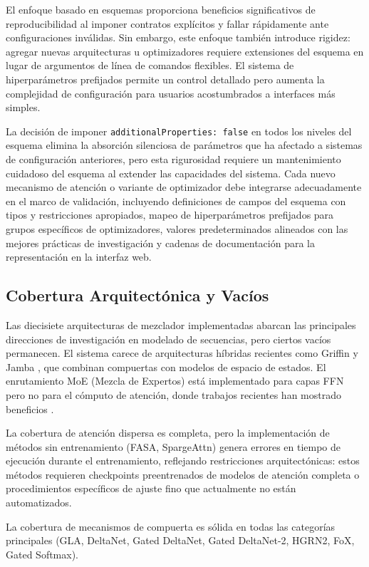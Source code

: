 \documentclass[11pt,a4paper]{article}
\begin{document}
El enfoque basado en esquemas proporciona beneficios significativos de reproducibilidad al imponer contratos explícitos y fallar rápidamente ante configuraciones inválidas. Sin embargo, este enfoque también introduce rigidez: agregar nuevas arquitecturas u optimizadores requiere extensiones del esquema en lugar de argumentos de línea de comandos flexibles. El sistema de hiperparámetros prefijados permite un control detallado pero aumenta la complejidad de configuración para usuarios acostumbrados a interfaces más simples.

La decisión de imponer \texttt{additionalProperties: false} en todos los niveles del esquema elimina la absorción silenciosa de parámetros que ha afectado a sistemas de configuración anteriores, pero esta rigurosidad requiere un mantenimiento cuidadoso del esquema al extender las capacidades del sistema. Cada nuevo mecanismo de atención o variante de optimizador debe integrarse adecuadamente en el marco de validación, incluyendo definiciones de campos del esquema con tipos y restricciones apropiados, mapeo de hiperparámetros prefijados para grupos específicos de optimizadores, valores predeterminados alineados con las mejores prácticas de investigación y cadenas de documentación para la representación en la interfaz web.

\subsection{Cobertura Arquitectónica y Vacíos}

Las diecisiete arquitecturas de mezclador implementadas abarcan las principales direcciones de investigación en modelado de secuencias, pero ciertos vacíos permanecen. El sistema carece de arquitecturas híbridas recientes como Griffin \citep{soares_griffin_2024} y Jamba \citep{gu_jamba_2024}, que combinan compuertas con modelos de espacio de estados. El enrutamiento MoE (Mezcla de Expertos) está implementado para capas FFN pero no para el cómputo de atención, donde trabajos recientes han mostrado beneficios \citep{lewis_moe_2021}.

La cobertura de atención dispersa es completa, pero la implementación de métodos sin entrenamiento (FASA, SpargeAttn) genera errores en tiempo de ejecución durante el entrenamiento, reflejando restricciones arquitectónicas: estos métodos requieren checkpoints preentrenados de modelos de atención completa o procedimientos específicos de ajuste fino que actualmente no están automatizados.

La cobertura de mecanismos de compuerta es sólida en todas las categorías principales (GLA, DeltaNet, Gated DeltaNet, Gated DeltaNet-2, HGRN2, FoX, Gated Softmax).
\end{document}
